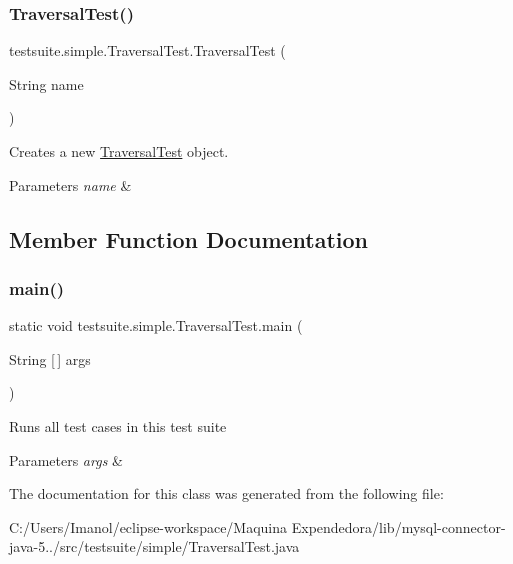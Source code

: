 \subsubsection{\texorpdfstring{Traversal\+Test()}{TraversalTest()}}
{\footnotesize\ttfamily testsuite.\+simple.\+Traversal\+Test.\+Traversal\+Test (\begin{DoxyParamCaption}\item[{String}]{name }\end{DoxyParamCaption})}

Creates a new \mbox{\hyperlink{classtestsuite_1_1simple_1_1_traversal_test}{Traversal\+Test}} object.


\begin{DoxyParams}{Parameters}
{\em name} & \\
\hline
\end{DoxyParams}


\subsection{Member Function Documentation}
\mbox{\label{classtestsuite_1_1simple_1_1_traversal_test_a26e0a3c13820f4daedefe73785a7fde8}} 
\subsubsection{\texorpdfstring{main()}{main()}}
{\footnotesize\ttfamily static void testsuite.\+simple.\+Traversal\+Test.\+main (\begin{DoxyParamCaption}\item[{String \mbox{[}$\,$\mbox{]}}]{args }\end{DoxyParamCaption})\hspace{0.3cm}{\ttfamily [static]}}

Runs all test cases in this test suite


\begin{DoxyParams}{Parameters}
{\em args} & \\
\hline
\end{DoxyParams}


The documentation for this class was generated from the following file\+:\begin{DoxyCompactItemize}
\item 
C\+:/\+Users/\+Imanol/eclipse-\/workspace/\+Maquina Expendedora/lib/mysql-\/connector-\/java-\/5../src/testsuite/simple/Traversal\+Test.\+java\end{DoxyCompactItemize}
